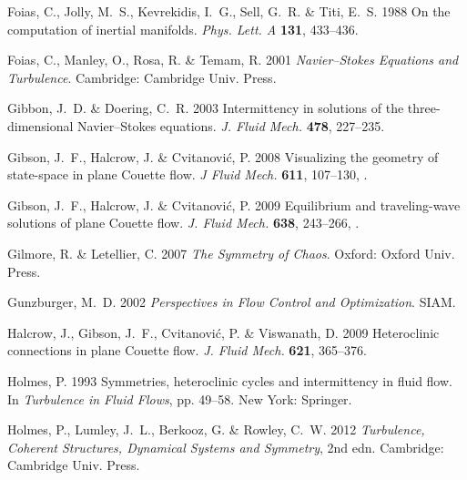 \documentclass{article}
\begin{document}
\begin{thebibliography}{68}
{\sc Foias, C., Jolly, M.~S., Kevrekidis, I.~G., Sell, G.~R. \& Titi, E.~S.}
  1988 On the computation of inertial manifolds. {\em Phys. Lett. A\/} {\bf
  131}, 433--436.

{\sc Foias, C., Manley, O., Rosa, R. \& Temam, R.} 2001 {\em {Navier--Stokes}
  Equations and Turbulence\/}. Cambridge: Cambridge Univ. Press.

{\sc Gibbon, J.~D. \& Doering, C.~R.} 2003 Intermittency in solutions of the
  three-dimensional {N}avier--{S}tokes equations. {\em J. Fluid Mech.\/} {\bf
  478}, 227--235.

{\sc Gibson, J.~F., Halcrow, J. \& Cvitanovi{\'c}, P.} 2008 Visualizing the
  geometry of state-space in plane {Couette} flow. {\em J Fluid Mech.\/} {\bf
  611}, 107--130, .

{\sc Gibson, J.~F., Halcrow, J. \& Cvitanovi{\'c}, P.} 2009 Equilibrium and
  traveling-wave solutions of plane {Couette} flow. {\em J. Fluid Mech.\/} {\bf
  638}, 243--266, .

{\sc Gilmore, R. \& Letellier, C.} 2007 {\em The Symmetry of Chaos\/}. Oxford:
  Oxford Univ. Press.

{\sc Gunzburger, M.~D.} 2002 {\em Perspectives in Flow Control and
  Optimization\/}. SIAM.

{\sc Halcrow, J., Gibson, J.~F., Cvitanovi{\'c}, P. \& Viswanath, D.} 2009
  Heteroclinic connections in plane {C}ouette flow. {\em J. Fluid Mech.\/} {\bf
  621}, 365--376.

{\sc Holmes, P.} 1993 Symmetries, heteroclinic cycles and intermittency in
  fluid flow. In {\em Turbulence in Fluid Flows\/}, pp. 49--58. New York:
  Springer.

{\sc Holmes, P., Lumley, J.~L., Berkooz, G. \& Rowley, C.~W.} 2012 {\em
  Turbulence, Coherent Structures, Dynamical Systems and Symmetry\/}, 2nd edn.
  Cambridge: Cambridge Univ. Press.


\end{thebibliography}
\end{document}
